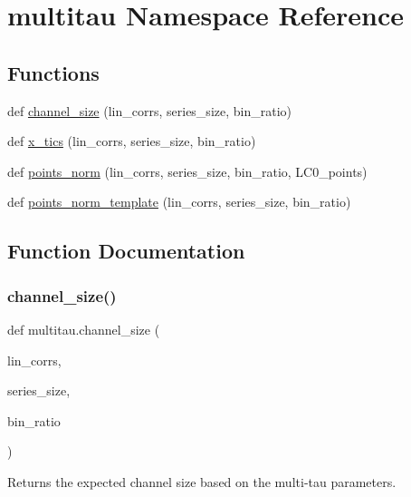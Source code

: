 \hypertarget{namespacemultitau}{}\section{multitau Namespace Reference}
\label{namespacemultitau}
\subsection*{Functions}
\begin{DoxyCompactItemize}
\item 
def \hyperlink{namespacemultitau_a1022c52950a892396ac45e7de5379e12}{channel\+\_\+size} (lin\+\_\+corrs, series\+\_\+size, bin\+\_\+ratio)
\item 
def \hyperlink{namespacemultitau_a775aea685fe55a6707400660fadf9c35}{x\+\_\+tics} (lin\+\_\+corrs, series\+\_\+size, bin\+\_\+ratio)
\item 
def \hyperlink{namespacemultitau_a89bb2627a88498b04ebd436250310d71}{points\+\_\+norm} (lin\+\_\+corrs, series\+\_\+size, bin\+\_\+ratio, L\+C0\+\_\+points)
\item 
def \hyperlink{namespacemultitau_a6a712a94c13f6c08874ea710fc698ff7}{points\+\_\+norm\+\_\+template} (lin\+\_\+corrs, series\+\_\+size, bin\+\_\+ratio)
\end{DoxyCompactItemize}


\subsection{Function Documentation}
\mbox{\label{namespacemultitau_a1022c52950a892396ac45e7de5379e12}} 
\subsubsection{\texorpdfstring{channel\+\_\+size()}{channel\_size()}}
{\footnotesize\ttfamily def multitau.\+channel\+\_\+size (\begin{DoxyParamCaption}\item[{}]{lin\+\_\+corrs,  }\item[{}]{series\+\_\+size,  }\item[{}]{bin\+\_\+ratio }\end{DoxyParamCaption})}

\begin{DoxyVerb}Returns the expected channel size based on the multi-tau parameters.
\end{DoxyVerb}
 \mbox{\label{namespacemultitau_a89bb2627a88498b04ebd436250310d71}} 
